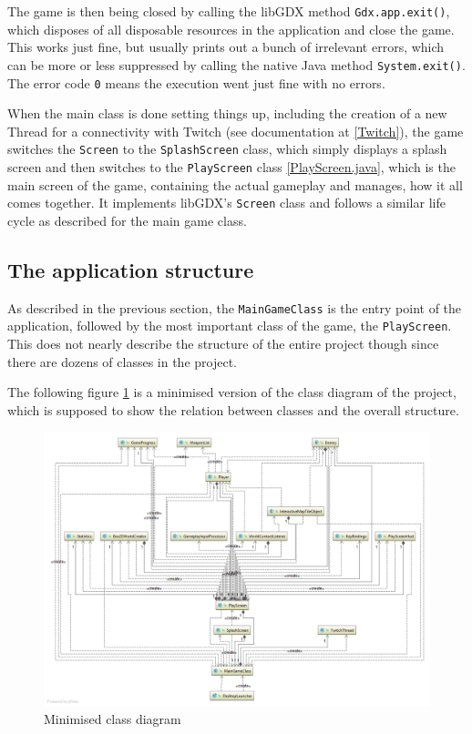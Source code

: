 \documentclass[12p]{article}
\begin{document}
The game is then being closed by calling the libGDX method \texttt{Gdx.app.exit()}, which disposes of all disposable resources in the application and close the game. This works just fine, but usually prints out a bunch of irrelevant errors, which can be more or less suppressed by calling the native Java method \texttt{System.exit()}. The error code \texttt{0} means the execution went just fine with no errors.

When the main class is done setting things up, including the creation of a new Thread for a connectivity with Twitch (see documentation at \ref{Twitch}), the game switches the \texttt{Screen} to the \texttt{SplashScreen} class, which simply displays a splash screen and then switches to the \texttt{PlayScreen} class \ref{PlayScreen.java}, which is the main screen of the game, containing the actual gameplay and manages, how it all comes together. It implements libGDX's \texttt{Screen} class and follows a similar life cycle as described for the main game class.


\subsection{The application structure} \label{DocApplicationStructure}

As described in the previous section, the \texttt{MainGameClass} is the entry point of the application, followed by the most important class of the game, the \texttt{PlayScreen}. This does not nearly describe the structure of the entire project though since there are dozens of classes in the project.

The following figure \ref{fig:minClassDiagram} is a minimised version of the class diagram of the project, which is supposed to show the relation between classes and the overall structure.

\begin{figure}[ht]
    \centering
    \includegraphics[width=1\textwidth]{Documentation/class_diagram_minimized.png}
    \caption{Minimised class diagram}
    \label{fig:minClassDiagram}
\end{figure}
\end{document}
